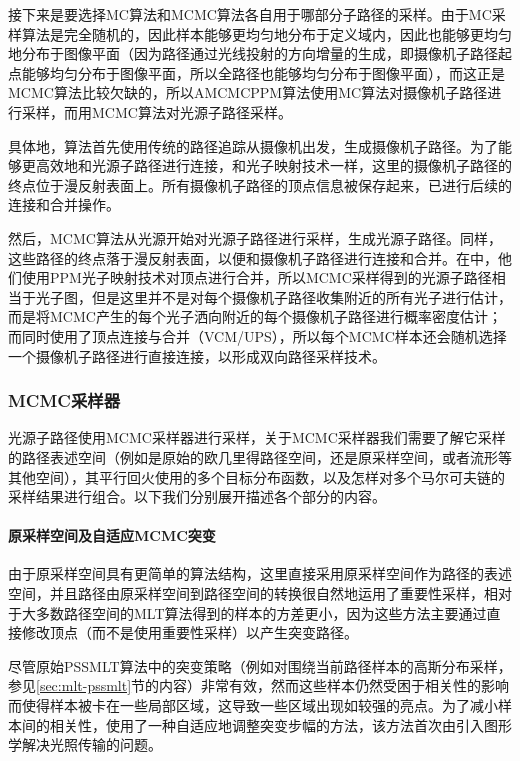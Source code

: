 接下来是要选择MC算法和MCMC算法各自用于哪部分子路径的采样。由于MC采样算法是完全随机的，因此样本能够更均匀地分布于定义域内，因此也能够更均匀地分布于图像平面（因为路径通过光线投射的方向增量的生成，即摄像机子路径起点能够均匀分布于图像平面，所以全路径也能够均匀分布于图像平面），而这正是MCMC算法比较欠缺的，所以AMCMCPPM算法使用MC算法对摄像机子路径进行采样，而用MCMC算法对光源子路径采样。

具体地，算法首先使用传统的路径追踪从摄像机出发，生成摄像机子路径。为了能够更高效地和光源子路径进行连接，和光子映射技术一样，这里的摄像机子路径的终点位于漫反射表面上。所有摄像机子路径的顶点信息被保存起来，已进行后续的连接和合并操作。

然后，MCMC算法从光源开始对光源子路径进行采样，生成光源子路径。同样，这些路径的终点落于漫反射表面，以便和摄像机子路径进行连接和合并。在\cite{a:RobustAdaptivePhotonTracingusingPhotonPathVisibility}中，他们使用PPM光子映射技术对顶点进行合并，所以MCMC采样得到的光源子路径相当于光子图，但是这里并不是对每个摄像机子路径收集附近的所有光子进行估计，而是将MCMC产生的每个光子洒向附近的每个摄像机子路径进行概率密度估计；而\cite{a:RobustLightTransportSimulationviaMetropolisedBidirectionalEstimators}同时使用了顶点连接与合并（VCM/UPS），所以每个MCMC样本还会随机选择一个摄像机子路径进行直接连接，以形成双向路径采样技术。





\subsubsection{MCMC采样器}\label{sec:mlt-mcmc-sampler}
光源子路径使用MCMC采样器进行采样，关于MCMC采样器我们需要了解它采样的路径表述空间（例如是原始的欧几里得路径空间，还是原采样空间，或者流形等其他空间），其平行回火使用的多个目标分布函数，以及怎样对多个马尔可夫链的采样结果进行组合。以下我们分别展开描述各个部分的内容。




\paragraph{原采样空间及自适应MCMC突变}
由于原采样空间具有更简单的算法结构，这里直接采用原采样空间作为路径的表述空间，并且路径由原采样空间到路径空间的转换很自然地运用了重要性采样，相对于大多数路径空间的MLT算法得到的样本的方差更小，因为这些方法主要通过直接修改顶点（而不是使用重要性采样）以产生突变路径。

尽管原始PSSMLT算法中的突变策略（例如对围绕当前路径样本的高斯分布采样，参见\ref{sec:mlt-pssmlt}节的内容）非常有效，然而这些样本仍然受困于相关性的影响而使得样本被卡在一些局部区域，这导致一些区域出现如较强的亮点。为了减小样本间的相关性，\cite{a:RobustLightTransportSimulationviaMetropolisedBidirectionalEstimators}使用了一种自适应地调整突变步幅的方法，该方法首次由\cite{a:RobustAdaptivePhotonTracingusingPhotonPathVisibility}引入图形学解决光照传输的问题。

